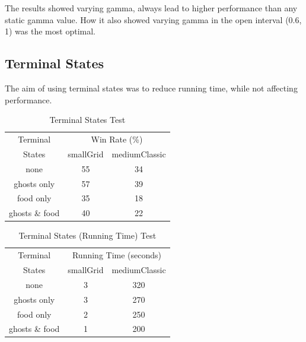 \documentclass[letterpaper, 11pt, journal, final]{IEEEtran}
\begin{document}
The results showed varying gamma, always lead to higher performance than any static gamma value. How it also showed varying gamma in the open interval (0.6, 1) was the most optimal.

\subsection{Terminal States}
The aim of using terminal states was to reduce running time, while not affecting performance.

\begin{table}[h!]
\centering
\caption{Terminal States Test}
\begin{tabular}{c || c| c} 
 \hline
 Terminal & \multicolumn{2}{c}{Win Rate (\%)}\\
        \cline{2-3}
        States & smallGrid & mediumClassic\\
 \hline
 none & 55 & 34 \\ [0.5ex]
 ghosts only & \cellcolor{blue!18}57 & \cellcolor{blue!18}39 \\ [0.5ex]
 food only & 35 & 18\\ [0.5ex]
 ghosts \& food & 40 & 22\\ [0.5ex]
 \hline
\end{tabular}
\end{table}

\begin{table}[h!]
\centering
\caption{Terminal States (Running Time) Test}
\begin{tabular}{c || c| c} 
 \hline
 Terminal & \multicolumn{2}{c}{Running Time (seconds)}\\
        \cline{2-3}
        States & smallGrid & mediumClassic\\
 \hline
 none & 3 & 320\\ [0.5ex]
 ghosts only & 3 & 270 \\ [0.5ex]
 food only & 2 & 250\\ [0.5ex]
 ghosts \& food & \cellcolor{blue!18}1 & \cellcolor{blue!18}200\\ [0.5ex]
 \hline
\end{tabular}
\end{table}

\end{document}
